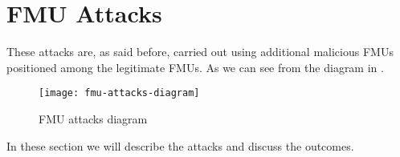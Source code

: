 \section{FMU Attacks}

These attacks are, as said before, carried out using additional malicious FMUs
positioned among the legitimate FMUs. As we can see from the diagram in
.

\begin{figure}[htb]
	\texttt{[image: fmu-attacks-diagram]}
	\caption{FMU attacks diagram}\label{fig:fmuatksdiagram}
\end{figure}

In these section we will describe the attacks and discuss the outcomes.




